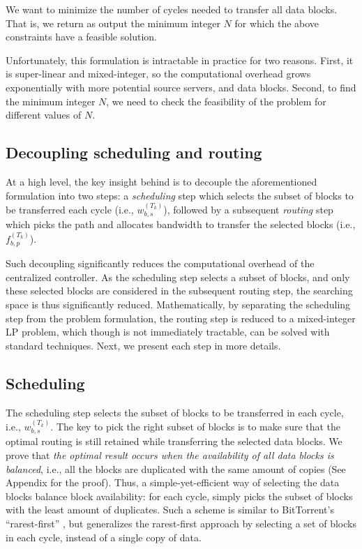  We want to minimize the number of cycles needed to
transfer all data blocks. That is, we return as output the minimum
integer $N$ for which the above constraints have a feasible solution.

Unfortunately, this formulation is intractable in practice for two
reasons. First, it is super-linear and mixed-integer, so the
computational overhead grows exponentially with more potential source
servers, and data blocks. Second, to find the minimum integer $N$, we
need to check the feasibility of the problem for different values of
$N$.

\subsection{Decoupling scheduling and routing}
\label{subsec:logic:separation}

At a high level, the key insight behind \name is to decouple the
aforementioned formulation into two steps: a {\em scheduling} step
which selects the subset of blocks to be transferred each cycle
(i.e., $w^{(T_k)}_{b,s}$), followed by a subsequent {\em routing}
step which picks the path and allocates bandwidth to transfer the
selected blocks (i.e.,
$f_{b,p}^{(T_k)}$).

Such decoupling significantly reduces the computational overhead of
the centralized controller. As the scheduling step selects a subset
of blocks, and only these selected blocks are considered in the
subsequent routing step, the searching space is thus significantly
reduced. Mathematically, by separating the scheduling step from the
problem formulation, the routing step is reduced to a mixed-integer
LP problem, which though is not immediately tractable, can be solved
with standard techniques. Next, we present each step in more details.

\subsection{Scheduling}
\label{subsec:logic:scheduling}

The scheduling step selects the subset of blocks to be transferred in
each cycle, i.e., $w^{(T_k)}_{b,s}$.
The key to pick the right subset of blocks is to make sure that the
optimal routing is still retained while transferring the selected data
blocks. We prove that {\em the optimal result occurs when the
availability of all data blocks is balanced}, i.e., all the blocks are
duplicated with the same amount of copies (See Appendix for the proof). Thus, a
simple-yet-efficient way of selecting the data blocks balance block
availability: for each cycle, \name simply picks the subset of blocks
with the least amount of duplicates. Such a scheme is similar to
BitTorrent's ``rarest-first'' \cite{Cohen2003Incentives}, but \name
generalizes the rarest-first approach by selecting a set of blocks in
each cycle, instead of a single copy of data.


